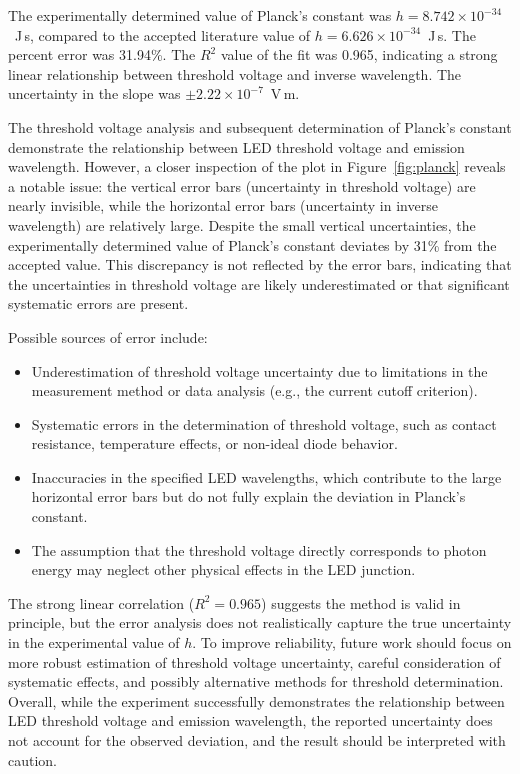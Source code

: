 \documentclass[12pt,a4paper]{article}
\begin{document}
The experimentally determined value of Planck's constant was $h = 8.742 \times 10^{-34}$~J\,s, compared to the accepted literature value of $h = 6.626 \times 10^{-34}$~J\,s. The percent error was 31.94\%. The $R^2$ value of the fit was 0.965, indicating a strong linear relationship between threshold voltage and inverse wavelength. The uncertainty in the slope was $\pm 2.22 \times 10^{-7}$~V\,m.

The threshold voltage analysis and subsequent determination of Planck's constant demonstrate the relationship between LED threshold voltage and emission wavelength. However, a closer inspection of the plot in Figure~\ref{fig:planck} reveals a notable issue: the vertical error bars (uncertainty in threshold voltage) are nearly invisible, while the horizontal error bars (uncertainty in inverse wavelength) are relatively large. Despite the small vertical uncertainties, the experimentally determined value of Planck's constant deviates by 31\% from the accepted value. This discrepancy is not reflected by the error bars, indicating that the uncertainties in threshold voltage are likely underestimated or that significant systematic errors are present.

Possible sources of error include:
\begin{itemize}
    \item Underestimation of threshold voltage uncertainty due to limitations in the measurement method or data analysis (e.g., the current cutoff criterion).
    \item Systematic errors in the determination of threshold voltage, such as contact resistance, temperature effects, or non-ideal diode behavior.
    \item Inaccuracies in the specified LED wavelengths, which contribute to the large horizontal error bars but do not fully explain the deviation in Planck's constant.
    \item The assumption that the threshold voltage directly corresponds to photon energy may neglect other physical effects in the LED junction.
\end{itemize}

The strong linear correlation ($R^2 = 0.965$) suggests the method is valid in principle, but the error analysis does not realistically capture the true uncertainty in the experimental value of $h$. To improve reliability, future work should focus on more robust estimation of threshold voltage uncertainty, careful consideration of systematic effects, and possibly alternative methods for threshold determination. Overall, while the experiment successfully demonstrates the relationship between LED threshold voltage and emission wavelength, the reported uncertainty does not account for the observed deviation, and the result should be interpreted with caution.
\end{document}
